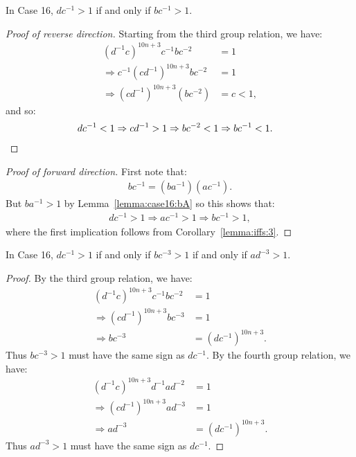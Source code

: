 \begin{lemma} In Case 16, $dc^{-1}>1$ if and only if $bc^{-1}>1$.
\label{lemma:iffs:4}
\end{lemma}
\begin{proof}[Proof of reverse direction]
Starting from the third group relation, we have:
\begin{align*}
(d^{-1}c)^{10n+3}c^{-1}bc^{-2}&=1\\
\Rightarrow{}c^{-1}(cd^{-1})^{10n+3}bc^{-2}&=1\\
\Rightarrow{}(cd^{-1})^{10n+3}(bc^{-2})&=c<1,
\end{align*}
and so:
\begin{align*}
dc^{-1}<1\Rightarrow{}cd^{-1}>1\Rightarrow{}bc^{-2}&<1\Rightarrow{}bc^{-1}<1. \qedhere
\end{align*}
\end{proof}

\begin{proof}[Proof of forward direction]
First note that:
\begin{align*}
bc^{-1}=(ba^{-1})(ac^{-1}).
\end{align*}
But $ba^{-1}>1$ by Lemma~\ref{lemma:case16:bA} so this shows that:
\begin{align*}
dc^{-1}>1\Rightarrow{}ac^{-1}>1\Rightarrow{}bc^{-1}>1,
\end{align*}
where the first implication follows from Corollary~\ref{lemma:iffs:3}.
\end{proof}

\begin{lemma} In Case 16, $dc^{-1}>1$ if and only if $bc^{-3}>1$ if and only if $ad^{-3}>1$.
\label{lemma:iffs:5}
\end{lemma}
\begin{proof}
By the third group relation, we have:
\begin{align*}
(d^{-1}c)^{10n+3}c^{-1}bc^{-2}&=1\\
\Rightarrow{}(cd^{-1})^{10n+3}bc^{-3}&=1\\
\Rightarrow{}bc^{-3}&=(dc^{-1})^{10n+3}.
\end{align*}
Thus $bc^{-3}>1$ must have the same sign as $dc^{-1}$. By the fourth group relation, we have:
\begin{align*}
(d^{-1}c)^{10n+3}d^{-1}ad^{-2}&=1\\
\Rightarrow{}(cd^{-1})^{10n+3}ad^{-3}&=1\\
\Rightarrow{}ad^{-3}&=(dc^{-1})^{10n+3}.
\end{align*}
Thus $ad^{-3}>1$ must have the same sign as $dc^{-1}$.
\end{proof}

